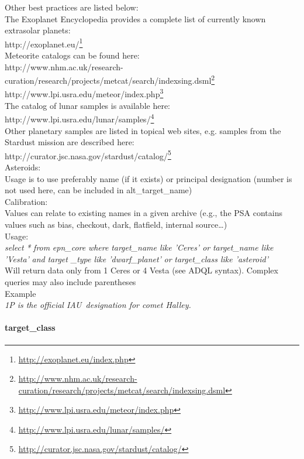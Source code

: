 \documentclass[11pt,a4paper]{ivoa}
\begin{document}
Other best practices are listed below: \\ The Exoplanet Encyclopedia provides a complete list of currently known extrasolar planets:\\ http://exoplanet.eu/\footnote{\url{http://exoplanet.eu/index.php}} \\ Meteorite catalogs can be found here:\\ http://www.nhm.ac.uk/research-curation/research/projects/metcat/search/indexsing.dsml\footnote{\url{http://www.nhm.ac.uk/research-curation/research/projects/metcat/search/indexsing.dsml}}\\ http://www.lpi.usra.edu/meteor/index.php\footnote{\url{http://www.lpi.usra.edu/meteor/index.php}} \\ The catalog of lunar samples is available here:\\ http://www.lpi.usra.edu/lunar/samples/\footnote{\url{http://www.lpi.usra.edu/lunar/samples/}} \\ Other planetary samples are listed in topical web sites, e.g. samples from the Stardust mission are described here:\\ http://curator.jsc.nasa.gov/stardust/catalog/\footnote{\url{http://curator.jsc.nasa.gov/stardust/catalog/}} \\Asteroids:\\Usage is to use preferably name (if it exists) or principal designation (number is not used here, can be included in alt\_target\_name)\\Calibration:\\Values can relate to existing names in a given archive (e.g., the PSA contains values such as bias, checkout, dark, flatfield, internal source…)\\ Usage:\\ \emph{select} \emph{*} \emph{from} \emph{epn\_core} \emph{where} \emph{target\_name like 'Ceres' or} \emph{target\_name like 'Vesta'} \emph{and} \emph{target} \_\emph{type like 'dwarf\_planet'} \emph{or} \emph{target\_class like 'asteroid'} \\ Will return data only from 1 Ceres or 4 Vesta (see ADQL syntax). Complex queries may also include parentheses \\ Example\\ \emph{1P is the official IAU designation for comet Halley.}

\paragraph{target\_class}
\end{document}
